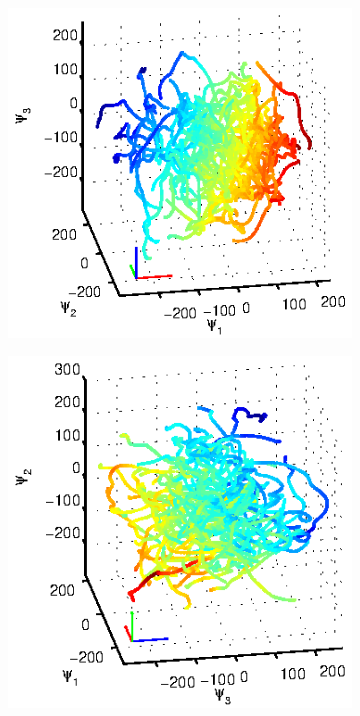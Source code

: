 \begin{figure}[t]
\centering
\begin{subfigure}{0.3\textwidth}
    \includegraphics[width=\textwidth]{ala2_embed1}
    \caption{}
    \label{subfig:ala_embed1}
\end{subfigure}
\begin{subfigure}{0.3\textwidth}
    \includegraphics[width=\textwidth]{ala2_embed2}

\end{subfigure}
\end{figure}
